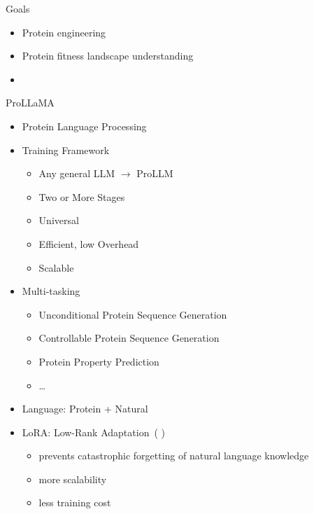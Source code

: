 \documentclass[dvipsnames,
hyperref={
	citecolor=blue,
	colorlinks=true,
	urlcolor=blue,
	linkcolor=,
}
]{beamer}
\let\oldcite\cite
\renewcommand{\cite}[1]{{\color{blue} \oldcite{#1}}}
\begin{document}
\begin{frame}{Goals}
\begin{itemize}\setlength\itemsep{3em}
	\item Protein engineering
	\item Protein fitness landscape understanding
	\item \cite{pan2021recent,ren2022proximal,song2023importance}
\end{itemize}
\end{frame}

\begin{frame}{ProLLaMA}
	\begin{itemize}
		\item Protein Language Processing
		\item Training Framework
		\begin{itemize}
			\item Any general LLM $\rightarrow$ ProLLM
			\item Two or More Stages
			\item Universal
			\item Efficient, low Overhead
			\item Scalable
		\end{itemize}
		\item Multi-tasking
		\begin{itemize}
			\item Unconditional Protein Sequence Generation
			\item Controllable Protein Sequence Generation
			\item Protein Property Prediction
			\item \dots
		\end{itemize}
		\item Language: Protein + Natural
		\item %
		LoRA: Low-Rank Adaptation~(\cite{hu2021lora})
		\begin{itemize}
			\item prevents catastrophic forgetting of natural language knowledge
			\item more scalability
			\item less training cost
		\end{itemize}
	\end{itemize}
\end{frame}




\end{document}
